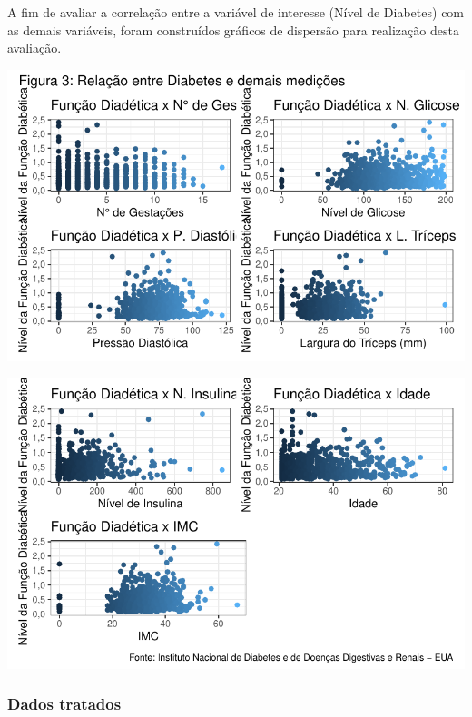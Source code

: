 \documentclass[
  letterpaper,
  DIV=11,
  numbers=noendperiod]{scrartcl}
\begin{document}
A fim de avaliar a correlação entre a variável de interesse (Nível de
Diabetes) com as demais variáveis, foram construídos gráficos de
dispersão para realização desta avaliação.

\includegraphics{relatorio_lab1_files/figure-pdf/unnamed-chunk-6-1.pdf}

\includegraphics{relatorio_lab1_files/figure-pdf/unnamed-chunk-6-2.pdf}

\subsubsection{Dados tratados}
\end{document}

